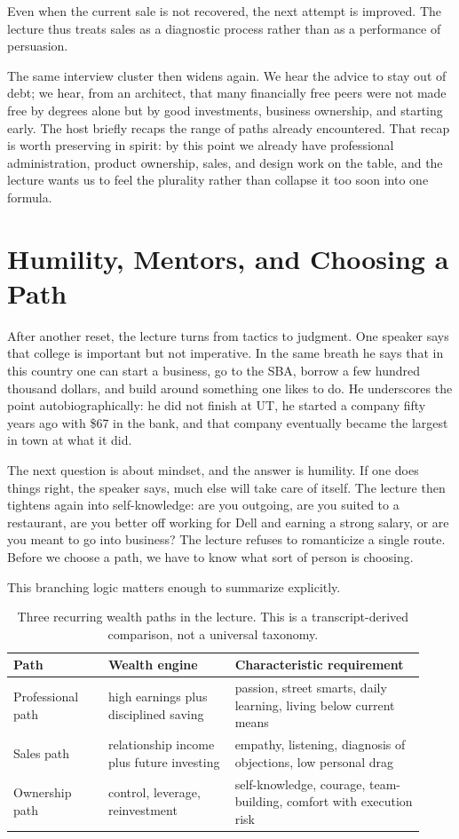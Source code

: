 Even when the current sale is not recovered, the next attempt is improved. The lecture thus treats sales as a diagnostic process rather than as a performance of persuasion.

The same interview cluster then widens again. We hear the advice to stay out of debt; we hear, from an architect, that many financially free peers were not made free by degrees alone but by good investments, business ownership, and starting early. The host briefly recaps the range of paths already encountered. That recap is worth preserving in spirit: by this point we already have professional administration, product ownership, sales, and design work on the table, and the lecture wants us to feel the plurality rather than collapse it too soon into one formula.

\section{Humility, Mentors, and Choosing a Path}

After another reset, the lecture turns from tactics to judgment. One speaker says that college is important but not imperative. In the same breath he says that in this country one can start a business, go to the SBA, borrow a few hundred thousand dollars, and build around something one likes to do. He underscores the point autobiographically: he did not finish at UT, he started a company fifty years ago with \$67 in the bank, and that company eventually became the largest in town at what it did.

The next question is about mindset, and the answer is humility. If one does things right, the speaker says, much else will take care of itself. The lecture then tightens again into self-knowledge: are you outgoing, are you suited to a restaurant, are you better off working for Dell and earning a strong salary, or are you meant to go into business? The lecture refuses to romanticize a single route. Before we choose a path, we have to know what sort of person is choosing.

This branching logic matters enough to summarize explicitly.

\begin{table}[h]
\centering
\begin{tabular}{p{0.21\linewidth}p{0.29\linewidth}p{0.42\linewidth}}
\hline
Path & Wealth engine & Characteristic requirement \\
\hline
Professional path & high earnings plus disciplined saving & passion, street smarts, daily learning, living below current means \\
Sales path & relationship income plus future investing & empathy, listening, diagnosis of objections, low personal drag \\
Ownership path & control, leverage, reinvestment & self-knowledge, courage, team-building, comfort with execution risk \\
\hline
\end{tabular}
\caption{Three recurring wealth paths in the lecture. This is a transcript-derived comparison, not a universal taxonomy.}
\end{table}

